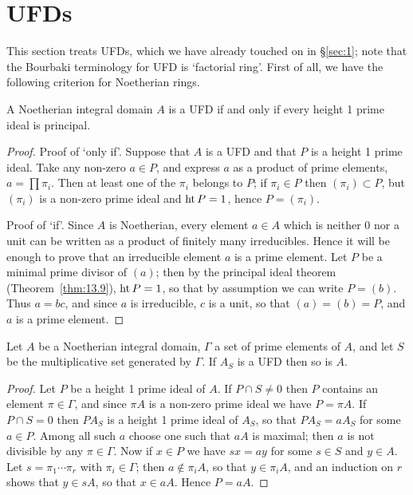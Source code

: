 \section{UFDs}\label{sec:20}

This section treats UFDs, which we have already touched on in
\S\ref{sec:1}; note that the Bourbaki terminology for UFD is `factorial ring'. First of
all, we have the following criterion for Noetherian rings.

\begin{theorem}\label{thm:20.1}
A Noetherian integral domain $A$ is a UFD if and only if
every height 1 prime ideal is principal.
\end{theorem}

\begin{proof}
Proof of `only if'. Suppose that $A$ is a UFD and that $P$ is a height 1
prime ideal. Take any non-zero $a \in P$, and express $a$ as a product of prime
elements, $a = \prod \pi_i$. Then at least one of the $\pi_i$ belongs to $P$; if $\pi_i \in P$ then
$(\pi_i) \subset P$, but $(\pi_i)$ is a non-zero prime ideal and $\operatorname{ht} P = 1$, hence $P = (\pi_i)$.

Proof of `if'. Since $A$ is Noetherian, every element $a \in A$ which is neither
0 nor a unit can be written as a product of finitely many irreducibles.
Hence it will be enough to prove that an irreducible element $a$ is a prime
element. Let $P$ be a minimal prime divisor of $(a)$; then by the principal
ideal theorem (Theorem~\ref{thm:13.9}), $\operatorname{ht} P = 1$, so that by assumption we can
write $P = (b)$. Thus $a = bc$, and since $a$ is irreducible, $c$ is a unit, so that
$(a) = (b) = P$, and $a$ is a prime element.
\end{proof}

\begin{theorem}\label{thm:20.2}
Let $A$ be a Noetherian integral domain, $\Gamma$ a set of prime
elements of $A$, and let $S$ be the multiplicative set generated by $\Gamma$. If $A_S$
is a UFD then so is $A$.
\end{theorem}

\begin{proof}
Let $P$ be a height 1 prime ideal of $A$. If $P \cap S \neq 0$ then $P$ contains
an element $\pi \in \Gamma$, and since $\pi A$ is a non-zero prime ideal we have $P = \pi A$.
If $P \cap S = 0$ then $PA_S$ is a height 1 prime ideal of $A_S$, so that $PA_S = aA_S$
for some $a \in P$. Among all such $a$ choose one such that $aA$ is maximal;
then $a$ is not divisible by any $\pi \in \Gamma$. Now if $x \in P$ we have $sx = ay$ for
some $s \in S$ and $y \in A$. Let $s = \pi_1 \cdots \pi_r$ with $\pi_i \in \Gamma$; then $a \notin \pi_iA$, so
that $y \in \pi_iA$, and an induction on $r$ shows that $y \in sA$, so that $x \in aA$. Hence
$P = aA$.
\end{proof}

